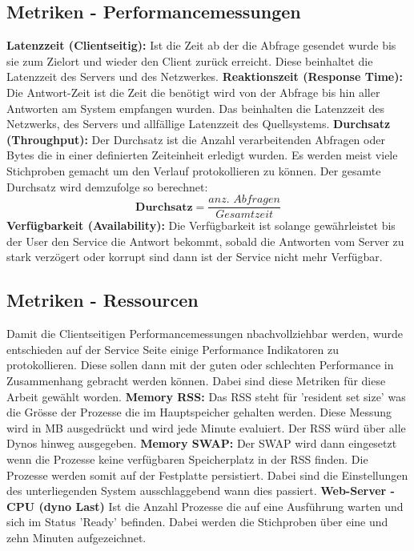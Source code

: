 \documentclass[main.tex]{subfiles}
\begin{document}
\subsection{Metriken - Performancemessungen}

\textbf{Latenzzeit (Clientseitig):} Ist die Zeit ab der die Abfrage gesendet wurde bis sie zum Zielort und wieder den Client zurück erreicht. Diese beinhaltet die Latenzzeit des Servers und des Netzwerkes. 
\newline
\noindent
\textbf{Reaktionszeit (Response Time):} Die Antwort-Zeit ist die Zeit die benötigt wird von der Abfrage bis hin aller Antworten am System empfangen wurden. Das beinhalten die Latenzzeit des Netzwerks, des Servers und allfällige Latenzzeit des Quellsystems.
\newline
\noindent
\textbf{Durchsatz (Throughput):} Der Durchsatz ist die Anzahl verarbeitenden Abfragen oder Bytes die in einer definierten Zeiteinheit erledigt wurden. Es werden meist viele Stichproben gemacht um den Verlauf protokollieren zu können. Der gesamte Durchsatz wird demzufolge so berechnet:
\begin{equation}
\textbf{Durchsatz} = \frac{\textit{anz. Abfragen}}{\textit{Gesamtzeit}}
\end{equation}
\newline
\noindent
\textbf{Verfügbarkeit (Availability):} Die Verfügbarkeit ist solange gewährleistet bis der User den Service die Antwort bekommt, sobald die Antworten vom Server zu stark verzögert oder korrupt sind dann ist der Service nicht mehr Verfügbar. 






\subsection{Metriken - Ressourcen}
Damit die Clientseitigen Performancemessungen nbachvollziehbar werden, wurde entschieden auf der Service Seite einige Performance Indikatoren zu protokollieren. Diese sollen dann mit der guten oder schlechten Performance in Zusammenhang gebracht werden können. Dabei sind diese Metriken für diese Arbeit gewählt worden. 
\newline
\noindent
\textbf{Memory RSS:} Das RSS steht für 'resident set size' was die Grösse der Prozesse die im Hauptspeicher gehalten werden. Diese Messung wird in MB ausgedrückt und wird jede Minute evaluiert. Der RSS würd über alle Dynos hinweg ausgegeben.
\newline
\noindent
\textbf{Memory SWAP:} Der SWAP wird dann eingesetzt wenn die Prozesse keine verfügbaren Speicherplatz in der RSS finden. Die Prozesse werden somit auf der Festplatte persistiert. Dabei sind die Einstellungen des unterliegenden System ausschlaggebend wann dies passiert. 
\newline
\noindent
\textbf{Web-Server - CPU (\gls{dyno} Last) } Ist die Anzahl Prozesse die auf eine Ausführung warten und sich im Status 'Ready' befinden. Dabei werden die Stichproben über eine und zehn Minuten aufgezeichnet. 
\end{document}
